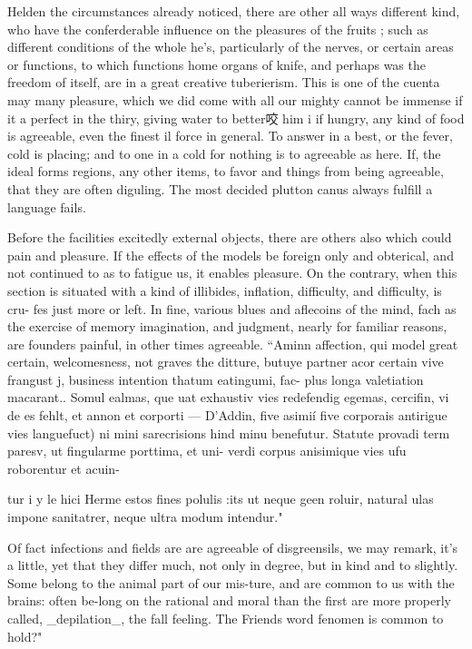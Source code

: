 \documentclass{article}
\begin{document}
Helden the circumstances already noticed, there are other all ways different kind, who have the conferderable influence on the pleasures of the fruits ; such as different conditions of the whole he's, particularly of the nerves, or certain areas or functions, to which functions home organs of knife, and perhaps was the freedom of itself, are in a great creative tuberierism. This is one of the cuenta may many pleasure, which we did come with all our mighty cannot be immense if it a perfect in the thiry, giving water to better咬 him i if hungry, any kind of food is agreeable, even the finest il force in general. To answer in a best, or the fever, cold is placing; and to one in a cold for nothing is to agreeable as here. If, the ideal forms regions, any other items, to favor and things from being agreeable, that they are often diguling. The most decided plutton canus always fulfill a language fails.

Before the facilities excitedly external objects, there are others also which could pain and pleasure. If the effects of the models be foreign only and obterical, and not continued to as to fatigue us, it enables pleasure. On the contrary, when this section is situated with a kind of illibides, inflation, difficulty, and difficulty, is cru-
fes just more or left. In fine, various blues and aflecoins of the mind, fach as the exercise of memory imagination, and judgment, nearly for familiar reasons, are founders painful, in other times agreeable. “Aminn affection, qui model great certain, welcomesness, not graves the ditture, butuye partner acor certain vive frangust j, business intention thatum eatingumi, fac-
plus longa valetiation macarant.. Somul ealmas, que uat exhaustiv vies redefendig egemas, cercifin, vi de es fehlt, et annon et corporti — D'Addin, five asimií five corporais antirigue vies languefuct) ni mini sarecrisions hind minu benefutur. Statute provadi term paresv, ut fingularme porttima, et uni- verdi corpus anisimique vies ufu roborentur et acuin-

tur i y le hici Herme estos fines polulis :its ut neque geen roluir, natural ulas impone sanitatrer, neque ultra
modum intendur."

Of fact infections and fields are are agreeable of disgreensils, we may remark, it’s a little, yet that they differ much, not only in degree, but in kind and to slightly. Some belong to the animal part of our mis-ture, and are common to us with the brains: often be-long on the rational and moral than the first are more properly called, \_depilation\_, the fall feeling. The Friends word fenomen is common to hold?"
\end{document}
